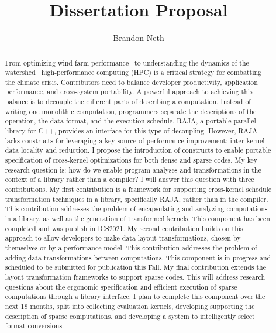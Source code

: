 \documentclass{article}
\author{Brandon Neth}
\title{Dissertation Proposal}
\begin{document}
\maketitle



\begin{abstract}
From optimizing wind-farm performance~\cite{sprague2020exawind} to understanding the dynamics of the watershed~\cite{olschanowsky2019hydroframe,condon2013implementation}
high-performance computing (HPC) is a critical strategy for combatting the climate crisis. 
Contributors need to balance developer productivity, application performance, and cross-system portability.
A powerful approach to achieving this balance is to decouple the different parts of describing a computation. 
Instead of writing one monolithic computation, programmers separate the descriptions of the operation, the data format, and the execution schedule.
RAJA, a portable parallel library for C++, provides an interface for this type of decoupling.
However, RAJA lacks constructs for leveraging a key source of performance improvement: inter-kernel data locality and reduction.
I propose the introduction of constructs to enable portable specification of cross-kernel optimizations for both dense and sparse codes.
My key research question is: how do we enable program analyses and transformations in the context of a library rather than a compiler?
I will answer this question with three contributions.
My first contribution is a framework for supporting cross-kernel schedule transformation techniques in a library, specifically RAJA, rather than in the compiler. 
This contribution addresses the problem of encapsulating and analyzing computations in a library, as well as the generation of transformed kernels. 
This component has been completed and was publish in ICS2021.
My second contribution builds on this approach to allow developers to make data layout transformations, chosen by themselves or by a performance model.
This contribution addresses the problem of adding data transformations between computations.
This component is in progress and scheduled to be submitted for publication this Fall.
My final contribution extends the layout transformation frameworks to support sparse codes.
This will address research questions about the ergonomic specification and efficient execution of sparse computations through a library interface.
I plan to complete this component over the next 18 months, split into collecting evaluation kernels, developing supporting the description of sparse computations, and developing a system to intelligently select format conversions.
\end{abstract}
\end{document}
